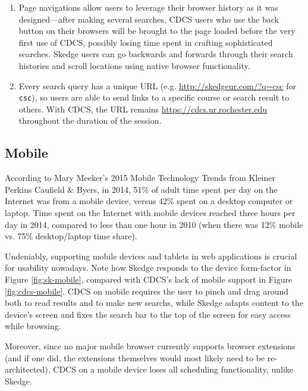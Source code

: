 \begin{enumerate}
  \item Page navigations allow users to leverage their browser history as it was designed---after making several searches, CDCS users who use the back button on their browsers will be brought to the page loaded before the very first use of CDCS, possibly losing time spent in crafting sophisticated searches. Skedge users can go backwards and forwards through their search histories and scroll locations using native browser functionality.
  \item Every search query has a unique URL (e.g. \url{http://skedgeur.com/?q=csc} for {\tt csc}), so users are able to send links to a specific course or search result to others. With CDCS, the URL remains \url{https://cdcs.ur.rochester.edu} throughout the duration of the session.
\end{enumerate}


\subsection{Mobile}

According to Mary Meeker's 2015 Mobile Technology Trends from Kleiner Perkins Caufield \& Byers\cite{kpcb}, in 2014, 51\% of adult time spent per day on the Internet was from a mobile device, versus 42\% spent on a desktop computer or laptop. Time spent on the Internet with mobile devices reached three hours per day in 2014, compared to less than one hour in 2010 (when there was 12\% mobile vs. 75\% desktop/laptop time share).

Undeniably, supporting mobile devices and tablets in web applications is crucial for usability nowadays. Note how Skedge responds to the device form-factor in Figure \ref{fig:sk-mobile}, compared with CDCS's lack of mobile support in Figure \ref{fig:cdcs-mobile}. CDCS on mobile requires the user to pinch and drag around both to read results and to make new searchs, while Skedge adapts content to the device's screen and fixes the search bar to the top of the screen for easy access while browsing.

Moreover, since no major mobile browser currently supports browser extensions (and if one did, the extensions themselves would most likely need to be re-architected), CDCS on a mobile device loses all scheduling functionality, unlike Skedge.

